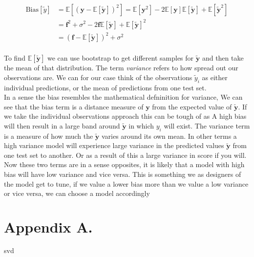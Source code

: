 \documentclass[twoside,11pt]{report}
\begin{document}
\begin{align*}
\mathrm{Bias}[\tilde{y}]& =\mathbb{E}\left[\left(\boldsymbol{y}-\mathbb{E}\left[\boldsymbol{\tilde{y}}\right]\right)^2\right] = \mathbb{E}[\boldsymbol{y}^2] - 2\mathbb{E}[\boldsymbol{y}]\mathbb{E}[\boldsymbol{\tilde{y}}] + \mathbb{E}[\boldsymbol{\tilde{y}}^2]\\
& = \boldsymbol{f}^2 + \sigma^2 - 2\boldsymbol{f}\mathbb{E}[\boldsymbol{\tilde{y}}] + \mathbb{E}[\boldsymbol{\tilde{y}}]^2\\
& = (\boldsymbol{f} - \mathbb{E}[\boldsymbol{\tilde{y}}])^2 + \sigma^2\\
\end{align*}


To find $\mathbb{E}[\boldsymbol{\tilde{y}}]$ we can use bootstrap to get different samples for $\boldsymbol{\tilde{y}}$ and then take the mean of that distribution.
The term \emph{variance} refers to how spread out our observations are. We can for our case think of the observations $\tilde{y}_i$
as either individual predictions, or the mean of predictions from one test set.\\
In a sense the bias resembles the mathematical defninition for variance, We can see that the bias term is a distance measure of $\boldsymbol{y}$ from the expected value of $\boldsymbol{\tilde{y}}$. If we take the individual observations approach this can be tough of as A high bias will then result in a large band around $\boldsymbol{\tilde{y}}$ in which $y_i$ will exist. The variance term is a measure of how much the $\boldsymbol{\tilde{y}}$ varies around its own mean. In other terms a high variance model will experience large variance in the predicted values $\boldsymbol{\tilde{y}}$ from one test set to another. Or as a result of this a large variance in score if you will. Now these two terms are in a sense opposites, it is likely that a model with high bias will have low variance and vice versa. This is something we as designers of the model get to tune, if we value a lower bias more than we value a low variance or vice versa, we can choose a model accordingly

\acks{}


\newpage

\appendix
\section*{Appendix A.}
\label{app:theorem}
svd






\vskip 0.2in

% 

\end{document}
